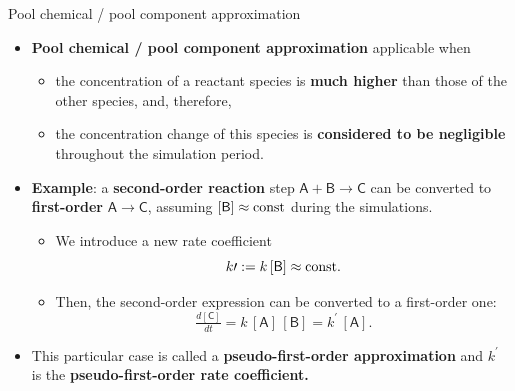 \begin{frame}{Pool chemical / pool component approximation}
	\small
	\begin{itemize}
		\item \alert{\bf Pool chemical / pool component approximation} applicable when 
		\begin{itemize}
			\item the concentration of a reactant species is {\bf much higher} than those of the other species, and, therefore, 
			\item the concentration change of this species is {\bf considered to be negligible} throughout the simulation period.
		\end{itemize}
	    \pause
		\item \alert{\bf Example}: a {\bf second-order reaction} step $\mathsf{A+ B \rightarrow C}$ can be converted to {\bf first-order} $\mathsf{A \rightarrow C}$,
		assuming $\mathsf{[B]} \approx {\rm const}$ during the simulations.
		\begin{itemize}
			\item We introduce a new rate coefficient
			\[k\prime := k \, \mathsf{[B]} \approx {\rm const}.\]
			\vskip -10pt
			\item Then, the second-order expression can be converted to a first-order one: 
			\[
			\tfrac{d\mathsf{[C]}}{dt} = k \, \mathsf{[A]\,[B]} = k^\prime \, \mathsf{[A]}.
			\]
			\vskip -10pt
		\end{itemize}
		\pause
		\item This particular case is called a  \alert{\bf pseudo-first-order approximation} and 
		$k^\prime$ is the \alert{\bf pseudo-first-order rate coefficient.}
	\end{itemize}
\end{frame}
%
%
